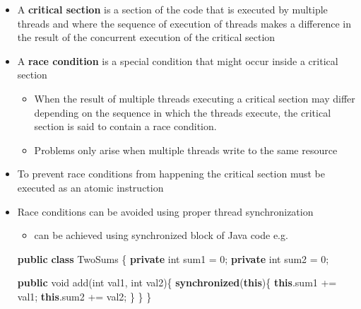 \documentclass[11pt]{article}
\providecommand{\tightlist}{%
      \setlength{\itemsep}{0pt}\setlength{\parskip}{0pt}}
\newenvironment{Shaded}{}{}
\newcommand{\KeywordTok}[1]{\textcolor[rgb]{0.00,0.44,0.13}{\textbf{{#1}}}}
\newcommand{\DataTypeTok}[1]{\textcolor[rgb]{0.56,0.13,0.00}{{#1}}}
\newcommand{\DecValTok}[1]{\textcolor[rgb]{0.25,0.63,0.44}{{#1}}}
\newcommand{\FunctionTok}[1]{\textcolor[rgb]{0.02,0.16,0.49}{{#1}}}
\newcommand{\NormalTok}[1]{{#1}}
\begin{document}
\begin{itemize}
\tightlist
\item
  A \textbf{critical section} is a section of the code that is executed
  by multiple threads and where the sequence of execution of threads
  makes a difference in the result of the concurrent execution of the
  critical section
\item
  A \textbf{race condition} is a special condition that might occur
  inside a critical section

  \begin{itemize}
  \tightlist
  \item
    When the result of multiple threads executing a critical section may
    differ depending on the sequence in which the threads execute, the
    critical section is said to contain a race condition.
  \item
    Problems only arise when multiple threads write to the same resource
  \end{itemize}
\item
  To prevent race conditions from happening the critical section must be
  executed as an atomic instruction
\item
  Race conditions can be avoided using proper thread synchronization

  \begin{itemize}
  \tightlist
  \item
    can be achieved using synchronized block of Java code e.g.
  \end{itemize}

\begin{Shaded}
\begin{Highlighting}[]
  \KeywordTok{public} \KeywordTok{class}\NormalTok{ TwoSums \{    }
      \KeywordTok{private} \DataTypeTok{int}\NormalTok{ sum1 = }\DecValTok{0}\NormalTok{;}
      \KeywordTok{private} \DataTypeTok{int}\NormalTok{ sum2 = }\DecValTok{0}\NormalTok{;}

      \KeywordTok{public} \DataTypeTok{void} \FunctionTok{add}\NormalTok{(}\DataTypeTok{int}\NormalTok{ val1, }\DataTypeTok{int}\NormalTok{ val2)\{}
          \KeywordTok{synchronized}\NormalTok{(}\KeywordTok{this}\NormalTok{)\{}
              \KeywordTok{this}\NormalTok{.}\FunctionTok{sum1}\NormalTok{ += val1;   }
              \KeywordTok{this}\NormalTok{.}\FunctionTok{sum2}\NormalTok{ += val2;}
\NormalTok{          \}}
\NormalTok{      \}}
\NormalTok{  \}}
\end{Highlighting}
\end{Shaded}


\end{itemize}
\end{document}

